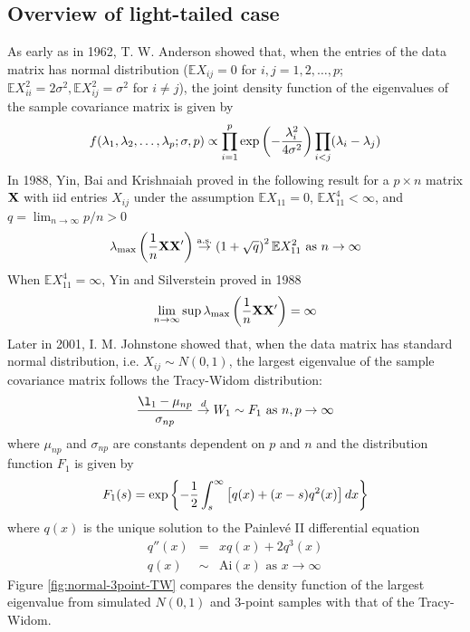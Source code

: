 \documentclass[11pt,reqno]{amsart}
\newcommand{\E}{\mathbb{E}}
\newcommand{\1}{\mathds{1}}
\newcommand{\0}{\boldsymbol{0}}
\newcommand{\M}{\text{max}}
\newcommand{\4}{\mathchoice{\mskip1.5mu}{\mskip1.5mu}{}{}}
\newcommand{\5}{\mathchoice{\mskip-1.5mu}{\mskip-1.5mu}{}{}}
\newcommand{\2}{\penalty250\mskip\thickmuskip\mskip-\thinmuskip} %
\newcommand{\as}{{\rm a.s.}}
\begin{document}
\newpage

\subsection{Overview of light-tailed
  case}\label{sec:light_tail_review}
As early as in 1962, T. W. Anderson \cite{anderson:1963} showed that,
when the entries of the data matrix has normal distribution ($\E
X_{ij} = 0$ for $i,j = 1,2,\dots, p$; $\E X_{ii}^2 = 2\sigma^2, \E
X_{ij}^2 = \sigma^2$ for $i \neq j$), the joint density function
of the eigenvalues of the sample covariance matrix is given by
\[
f(\lambda_1, \lambda_2, \dots, \lambda_p; \sigma, p) \propto \prod_{i=1}^p \exp\left(
  -{\lambda_i^2 \over 4\sigma^2}
\right) \prod_{i < j} (\lambda_i - \lambda_j)
\]
In 1988, Yin, Bai and Krishnaiah proved in
\cite{yin:bai:Krishnaiah:1988} the following result for a $p \times n$
matrix $\bf X$ with iid entries $X_{ij}$ under the assumption $\E
X_{11} = 0$, $\E X_{11}^4 < \infty$, and $q = \lim_{n \to \infty} p/n
> 0$
\[
\lambda_{\M}\left({1 \over n}\bf{XX'}\right) \overset{\as}{\to} \left(
  1 + \sqrt{q}
\right)^2 \E X_{11}^2 \text{ as }n \to \infty
\]
When $\E X_{11}^4 = \infty$, Yin and Silverstein proved in 1988
\cite{yin:silverstein:1988}
\[
\lim_{n \to \infty} \sup \lambda_{\M}\left({1 \over
    n}\bf{XX'}\right) = \infty
\]
Later in 2001, I. M. Johnstone showed that, when the data matrix has
standard normal distribution, i.e. $X_{ij} \sim N(0, 1)$, the largest
eigenvalue of the sample covariance matrix follows the Tracy-Widom
distribution:
\[
{ł_1 - \mu_{np} \over \sigma_{np}} \overset{d}{\to} W_1 \sim F_1
\text{ as }{n, p \to \infty}
\]
where $\mu_{np}$ and $\sigma_{np}$ are constants dependent on $p$ and
$n$ and the distribution function $F_1$ is given by
\[
F_1(s) = \exp\left\{
  -{1 \over 2} \int_{s}^\infty \left[
    q(x) + (x - s) q^2(x)
  \right] dx
\right\}
\]
where $q(x)$ is the unique solution to the Painlev\'e II differential
equation
\begin{eqnarray*}
  q''(x) &=& xq(x) + 2 q^3(x) \\
  q(x) &\sim& \text{Ai}(x) \text{ as } x \to \infty
\end{eqnarray*}
Figure \ref{fig:normal-3point-TW} compares the density function of the largest
eigenvalue from simulated $N(0,1)$ and 3-point samples with
that of the Tracy-Widom.
\end{document}

